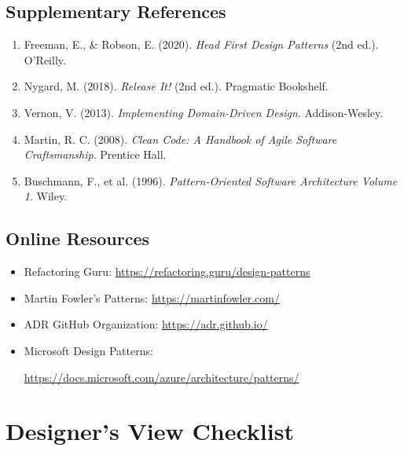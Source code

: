 \documentclass[11pt,letterpaper]{article}
\begin{document}
\subsection{Supplementary References}

\begin{enumerate}[resume]
    \item Freeman, E., \& Robson, E. (2020). \textit{Head First Design Patterns} (2nd ed.). O'Reilly.
    
    \item Nygard, M. (2018). \textit{Release It!} (2nd ed.). Pragmatic Bookshelf.
    
    \item Vernon, V. (2013). \textit{Implementing Domain-Driven Design}. Addison-Wesley.
    
    \item Martin, R. C. (2008). \textit{Clean Code: A Handbook of Agile Software Craftsmanship}. Prentice Hall.
    
    \item Buschmann, F., et al. (1996). \textit{Pattern-Oriented Software Architecture Volume 1}. Wiley.
\end{enumerate}

\subsection{Online Resources}

\begin{itemize}
    \item Refactoring Guru: \url{https://refactoring.guru/design-patterns}
    \item Martin Fowler's Patterns: \url{https://martinfowler.com/}
    \item ADR GitHub Organization: \url{https://adr.github.io/}
    \item Microsoft Design Patterns:\par\url{https://docs.microsoft.com/azure/architecture/patterns/}
\end{itemize}

\appendix

\section{Designer's View Checklist}
\end{document}
